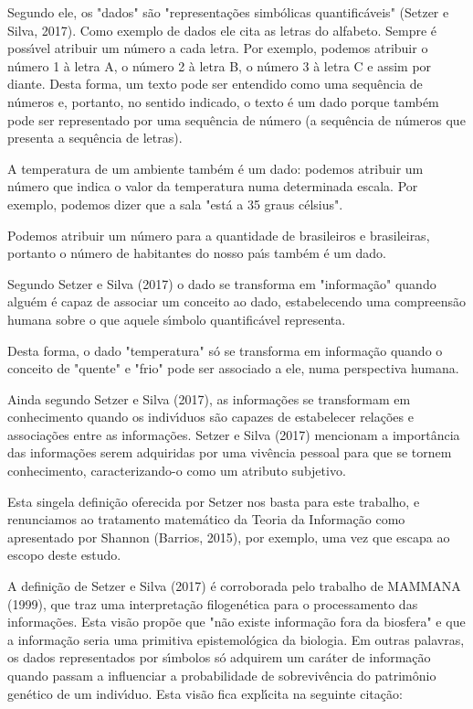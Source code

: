 \documentclass[
12pt,		%
openright,	%
twoside,  %
a4paper,			%
chapter=TITLE,		%
english,			%
french,				%
spanish,			%
brazil				%
]{USPSC-classe/USPSC}
\begin{document}
Segundo ele, os "dados" s\~ao "representa\c{c}\~oes simb\'olicas quantific\'aveis"  (Setzer e Silva, 2017). Como exemplo de dados ele cita as letras do alfabeto. Sempre \'e poss\'{\i}vel atribuir um n\'umero a cada letra. Por exemplo, podemos atribuir o n\'umero 1 \`a letra A, o n\'umero 2 \`a letra B, o n\'umero 3 \`a letra C e assim por diante. Desta forma, um texto pode ser entendido como uma sequ\^encia de n\'umeros e, portanto, no sentido indicado, o texto \'e um dado porque tamb\'em pode ser representado por uma sequ\^encia de n\'umero (a sequ\^encia de n\'umeros que presenta a sequ\^encia de letras).


A temperatura de um ambiente tamb\'em \'e um dado: podemos atribuir um n\'umero que indica o valor da temperatura numa determinada escala. Por exemplo, podemos dizer que a sala "est\'a a 35 graus c\'elsius".


Podemos atribuir um n\'umero para a quantidade de brasileiros e brasileiras, portanto o n\'umero de habitantes do nosso pa\'{\i}s tamb\'em \'e um dado.


Segundo Setzer e Silva (2017) o dado se transforma em "informa\c{c}\~ao" quando algu\'em \'e capaz de associar um conceito ao dado, estabelecendo uma compreens\~ao humana sobre o que aquele s\'{\i}mbolo quantific\'avel representa.


Desta forma, o dado "temperatura" s\'o se transforma em informa\c{c}\~ao quando o conceito de "quente" e "frio" pode ser associado a ele, numa perspectiva humana.


Ainda segundo Setzer e Silva (2017), as informa\c{c}\~oes se transformam em conhecimento quando os indiv\'{\i}duos s\~ao capazes de estabelecer rela\c{c}\~oes e associa\c{c}\~oes entre as informa\c{c}\~oes.  Setzer e Silva (2017) mencionam a import\^ancia das informa\c{c}\~oes serem adquiridas por uma viv\^encia pessoal para que se tornem conhecimento, caracterizando-o como um atributo subjetivo.


Esta singela defini\c{c}\~ao oferecida por Setzer nos basta para este trabalho, e renunciamos ao tratamento matem\'atico da Teoria da Informa\c{c}\~ao como apresentado por Shannon (Barrios, 2015), por exemplo, uma vez que escapa ao escopo deste estudo.


A defini\c{c}\~ao de Setzer e Silva (2017) \'e corroborada pelo trabalho de MAMMANA (1999), que traz uma interpreta\c{c}\~ao filogen\'etica para o processamento das informa\c{c}\~oes. Esta vis\~ao prop\~oe que "n\~ao existe informa\c{c}\~ao fora da biosfera" e que a informa\c{c}\~ao seria uma primitiva epistemol\'ogica da biologia. Em outras palavras, os dados representados por s\'{\i}mbolos s\'o adquirem um car\'ater de informa\c{c}\~ao quando passam a influenciar a probabilidade de sobreviv\^encia do patrim\^onio gen\'etico de um indiv\'{\i}duo. Esta vis\~ao fica expl\'{\i}cita na seguinte cita\c{c}\~ao:
\end{document}

